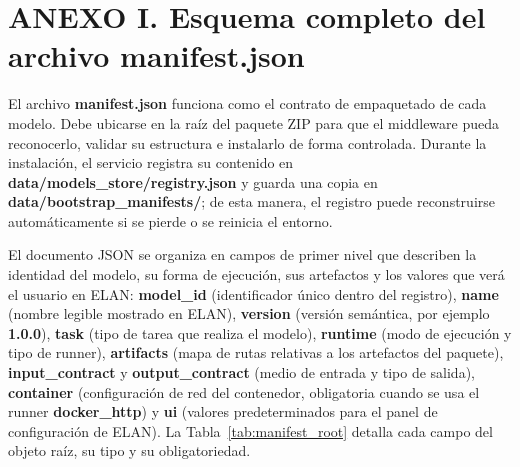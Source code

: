 
\section*{\normalfont ANEXO I. Esquema completo del archivo manifest.json}
\label{anx:manifest_schema}

\renewcommand{\thetable}{A.\arabic{table}}
\setcounter{table}{0}
\renewcommand{\thecodigo}{A.\arabic{codigo}}
\setcounter{codigo}{0}
\renewcommand{\thefigure}{A.\arabic{figure}}
\setcounter{figure}{0}

El archivo \textbf{manifest.json} funciona como el contrato de empaquetado de cada modelo. Debe ubicarse en la raíz del paquete ZIP para que el middleware pueda reconocerlo, validar su estructura e instalarlo de forma controlada. Durante la instalación, el servicio registra su contenido en \textbf{data/models\_store/registry.json} y guarda una copia en \textbf{data/bootstrap\_manifests/}; de esta manera, el registro puede reconstruirse automáticamente si se pierde o se reinicia el entorno.

El documento JSON se organiza en campos de primer nivel que describen la identidad del modelo, su forma de ejecución, sus artefactos y los valores que verá el usuario en ELAN: \textbf{model\_id} (identificador único dentro del registro), \textbf{name} (nombre legible mostrado en ELAN), \textbf{version} (versión semántica, por ejemplo \textbf{1.0.0}), \textbf{task} (tipo de tarea que realiza el modelo), \textbf{runtime} (modo de ejecución y tipo de runner), \textbf{artifacts} (mapa de rutas relativas a los artefactos del paquete), \textbf{input\_contract} y \textbf{output\_contract} (medio de entrada y tipo de salida), \textbf{container} (configuración de red del contenedor, obligatoria cuando se usa el runner \textbf{docker\_http}) y \textbf{ui} (valores predeterminados para el panel de configuración de ELAN). La Tabla~\ref{tab:manifest_root} detalla cada campo del objeto raíz, su tipo y su obligatoriedad.

